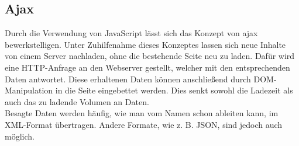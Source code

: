 \subsection{Ajax}
\label{sec:ajax}
Durch die Verwendung von JavaScript lässt sich das Konzept von \ac{ajax} bewerkstelligen. Unter Zuhilfenahme dieses Konzeptes lassen sich neue Inhalte von einem Server nachladen, ohne die bestehende Seite neu zu laden. Dafür wird eine HTTP-Anfrage an den Webserver gestellt, welcher mit den entsprechenden Daten antwortet. Diese erhaltenen Daten können anschließend durch DOM-Manipulation in die Seite eingebettet werden. Dies senkt sowohl die Ladezeit als auch das zu ladende Volumen an Daten. \\
Besagte Daten werden häufig, wie man vom Namen schon ableiten kann, im XML-Format übertragen. Andere Formate, wie z. B. JSON, sind jedoch auch möglich.